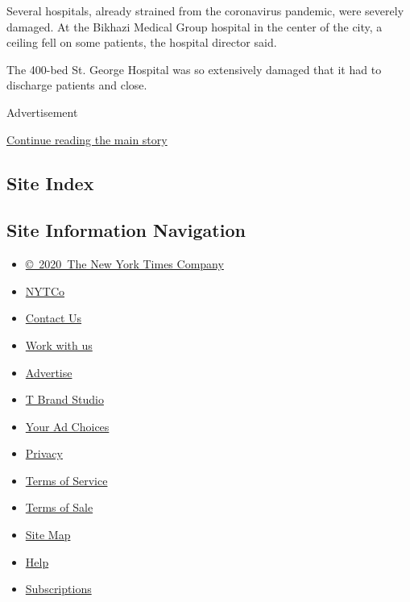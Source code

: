Several hospitals, already strained from the coronavirus pandemic, were
severely damaged. At the Bikhazi Medical Group hospital in the center of
the city, a ceiling fell on some patients, the hospital director said.

The 400-bed St. George Hospital was so extensively damaged that it had
to discharge patients and close.

Advertisement

\protect\hyperlink{after-bottom}{Continue reading the main story}

\hypertarget{site-index}{%
\subsection{Site Index}\label{site-index}}

\hypertarget{site-information-navigation}{%
\subsection{Site Information
Navigation}\label{site-information-navigation}}

\begin{itemize}
\tightlist
\item
  \href{https://help.nytimes3xbfgragh.onion/hc/en-us/articles/115014792127-Copyright-notice}{©~2020~The
  New York Times Company}
\end{itemize}

\begin{itemize}
\tightlist
\item
  \href{https://www.nytco.com/}{NYTCo}
\item
  \href{https://help.nytimes3xbfgragh.onion/hc/en-us/articles/115015385887-Contact-Us}{Contact
  Us}
\item
  \href{https://www.nytco.com/careers/}{Work with us}
\item
  \href{https://nytmediakit.com/}{Advertise}
\item
  \href{http://www.tbrandstudio.com/}{T Brand Studio}
\item
  \href{https://www.nytimes3xbfgragh.onion/privacy/cookie-policy\#how-do-i-manage-trackers}{Your
  Ad Choices}
\item
  \href{https://www.nytimes3xbfgragh.onion/privacy}{Privacy}
\item
  \href{https://help.nytimes3xbfgragh.onion/hc/en-us/articles/115014893428-Terms-of-service}{Terms
  of Service}
\item
  \href{https://help.nytimes3xbfgragh.onion/hc/en-us/articles/115014893968-Terms-of-sale}{Terms
  of Sale}
\item
  \href{https://spiderbites.nytimes3xbfgragh.onion}{Site Map}
\item
  \href{https://help.nytimes3xbfgragh.onion/hc/en-us}{Help}
\item
  \href{https://www.nytimes3xbfgragh.onion/subscription?campaignId=37WXW}{Subscriptions}
\end{itemize}
